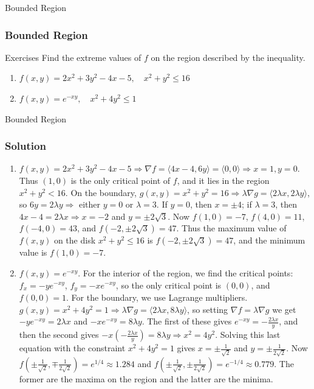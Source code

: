 \documentclass[aspectratio=169, UTF8]{beamer}
\begin{document}
\begin{frame}{Bounded Region}
    \frametitle{Bounded Region}
    \begin{block}{Exercises}
        Find the extreme values of $f$ on the region described by the inequality.
        \begin{enumerate}
            \item $f(x, y) = 2x^2 + 3y^2 - 4x - 5, \quad x^2 + y^2 \le 16$
            \item $f(x, y) = e^{-xy}, \quad x^2 + 4y^2 \le 1$
        \end{enumerate}
    \end{block}
\end{frame}
\begin{frame}{Bounded Region}
    \frametitle{Solution}
        \begin{enumerate}
            \item $f(x, y) = 2x^2 + 3y^2 - 4x - 5 \Rightarrow \nabla f = \langle 4x - 4, 6y \rangle = \langle 0, 0 \rangle \Rightarrow x = 1, y = 0$. Thus $(1, 0)$ is the only critical point of $f$, and it lies in the region $x^2 + y^2 < 16$. On the boundary, $g(x, y) = x^2 + y^2 = 16 \Rightarrow \lambda \nabla g = \langle 2\lambda x, 2\lambda y \rangle$, so $6y = 2\lambda y \Rightarrow$ either $y = 0$ or $\lambda = 3$. If $y = 0$, then $x = \pm 4$; if $\lambda = 3$, then $4x - 4 = 2\lambda x \Rightarrow x = -2$ and $y = \pm 2\sqrt{3}$. Now $f(1, 0) = -7$, $f(4, 0) = 11$, $f(-4, 0) = 43$, and $f(-2, \pm 2\sqrt{3}) = 47$. Thus the maximum value of $f(x, y)$ on the disk $x^2 + y^2 \le 16$ is $f(-2, \pm 2\sqrt{3}) = 47$, and the minimum value is $f(1, 0) = -7$.
            \item $f(x, y) = e^{-xy}$. For the interior of the region, we find the critical points: $f_x = -ye^{-xy}$, $f_y = -xe^{-xy}$, so the only critical point is $(0, 0)$, and $f(0, 0) = 1$. For the boundary, we use Lagrange multipliers. $g(x, y) = x^2 + 4y^2 = 1 \Rightarrow \lambda \nabla g = \langle 2\lambda x, 8\lambda y \rangle$, so setting $\nabla f = \lambda \nabla g$ we get $-ye^{-xy} = 2\lambda x$ and $-xe^{-xy} = 8\lambda y$. The first of these gives $e^{-xy} = -\frac{2\lambda x}{y}$, and then the second gives $-x(-\frac{2\lambda x}{y}) = 8\lambda y \Rightarrow x^2 = 4y^2$. Solving this last equation with the constraint $x^2 + 4y^2 = 1$ gives $x = \pm \frac{1}{\sqrt{2}}$ and $y = \pm \frac{1}{2\sqrt{2}}$. Now $f(\pm \frac{1}{\sqrt{2}}, \mp \frac{1}{2\sqrt{2}}) = e^{1/4} \approx 1.284$ and $f(\pm \frac{1}{\sqrt{2}}, \pm \frac{1}{2\sqrt{2}}) = e^{-1/4} \approx 0.779$. The former are the maxima on the region and the latter are the minima.
        \end{enumerate}
\end{frame}
\end{document}
